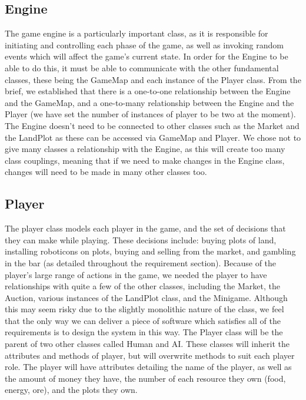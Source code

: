 \subsection{Engine}
The game engine is a particularly important class, as it is responsible for initiating and controlling each phase of the game, as well as invoking random events which will affect the game’s current state. In order for the Engine to be able to do this, it must be able to communicate with the other fundamental classes, these being the GameMap and each instance of the Player class.
From the brief, we established that there is a one-to-one relationship between the Engine and the GameMap, and a one-to-many relationship between the Engine and the Player (we have set the number of instances of player to be two at the moment). The Engine doesn’t need to be connected to other classes such as the Market and the LandPlot as these can be accessed via GameMap and Player.
We chose not to give many classes a relationship with the Engine, as this will create too many class couplings, meaning that if we need to make changes in the Engine class, changes will need to be made in many other classes too.

\subsection{Player}
The player class models each player in the game, and the set of decisions that they can make while playing.
These decisions include: buying plots of land, installing roboticons on plots, buying and selling from the market, and gambling in the bar (as detailed throughout the requirement section).
Because of the player’s large range of actions in the game, we needed the player to have relationships with quite a few of the other classes, including the Market, the Auction, various instances of the LandPlot class, and the Minigame.
Although this may seem risky due to the slightly monolithic nature of the class, we feel that the only way we can deliver a piece of software which satisfies all of the requirements is to design the system in this way.
The Player class will be the parent of two other classes called Human and AI.
These classes will inherit the attributes and methods of player, but will overwrite methods to suit each player role.
The player will have attributes detailing the name of the player, as well as the amount of money they have, the number of each resource they own (food, energy, ore), and the plots they own.

